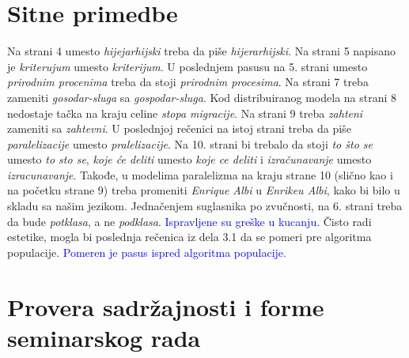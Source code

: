 \documentclass[a4paper]{report}
\newcommand{\odgovor}[1]{\textcolor{blue}{#1}}
\begin{document}
\section{Sitne primedbe}
Na strani 4 umesto {\em hijejarhijski} treba da piše {\em hijerarhijski}. Na strani 5 napisano je {\em kriterujum} umesto {\em kriterijum}. U poslednjem pasusu na 5. strani umesto {\em prirodnim procenima} treba da stoji {\em prirodnim procesima}. Na strani 7 treba zameniti {\em gosodar-sluga} sa {\em gospodar-sluga}. Kod distribuiranog modela na strani 8 nedostaje tačka na kraju celine {\em stopa migracije}. Na strani 9 treba {\em zahteni} zameniti sa {\em zahtevni}. U poslednjoj rečenici na istoj strani treba da piše {\em paralelizacije} umesto {\em pralelizacije}. Na 10. strani bi trebalo da stoji {\em to što se} umesto {\em to sto se}, {\em koje će deliti} umesto {\em koje ce deliti} i {\em izračunavanje} umesto {\em izracunavanje}.
Takođe, u modelima paralelizma na kraju strane 10 (slično kao i na početku strane 9) treba promeniti {\em Enrique Albi} u {\em Enrikeu Albi}, kako bi bilo u skladu sa našim jezikom. Jednačenjem suglasnika po zvučnosti, na 6. strani treba da bude {\em potklasa}, a ne {\em podklasa}. \odgovor{Ispravljene su greške u kucanju.} Čisto radi estetike, mogla bi poslednja rečenica iz dela 3.1 da se pomeri pre algoritma populacije. \odgovor{Pomeren je pasus ispred algoritma populacije.}

\section{Provera sadržajnosti i forme seminarskog rada}
\end{document}
